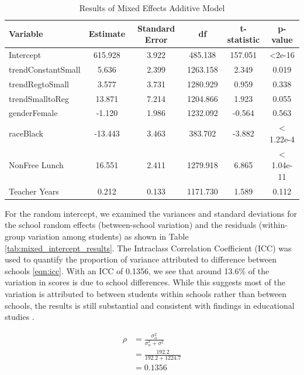 \documentclass[11pt]{article}
\begin{document}
\begin{table}[htbp]
\centering
\caption{Results of Mixed Effects Additive Model}
\label{tab:mixed_results}
\begin{tabular}{lccccc}
\toprule
\textbf{Variable} & \textbf{Estimate} & \textbf{Standard Error} & \textbf{df} & \textbf{t-statistic} & \textbf{p-value} \\
\midrule
Intercept & 615.928 & 3.922 & 485.138 & 157.051 & <2e-16 \\ 
trendConstantSmall & 5.636 & 2.399 & 1263.158 & 2.349 & 0.019 \\
trendRegtoSmall & 3.577 & 3.731 & 1280.929 & 0.959 & 0.338 \\
trendSmalltoReg & 13.871 & 7.214 & 1204.866 & 1.923 & 0.055 \\
genderFemale & -1.120 & 1.986 & 1232.092 & -0.564 & 0.563 \\
raceBlack & -13.443 & 3.463 & 383.702 & -3.882 & < 1.22e-4 \\
NonFree Lunch & 16.551 & 2.411 & 1279.918 & 6.865 & < 1.04e-11 \\
Teacher Years & 0.212 & 0.133 & 1171.730 & 1.589 & 0.112 \\
\bottomrule
\end{tabular}
\end{table}

For the random intercept, we examined the variances and standard deviations for the school random effects (between-school variation) and the residuals (within-group variation among students) as shown in Table \ref{tab:mixed_intercept_results}. The Intraclass Correlation Coefficient (ICC) was used to quantify the proportion of variance attributed to difference between schools \eqref{eqn:icc}. With an ICC of 0.1356, we see that around 13.6\% of the variation in scores is due to school differences. While this suggests most of the variation is attributed to between students within schools rather than between schools, the results is still substantial and consistent with findings in educational studies \cite{shear2026_icc}.

\begin{equation}
    \label{eqn:icc}
    \begin{aligned}
    \rho &= \frac{\sigma^2_\alpha}{\sigma^2_\alpha + \sigma^2}  \\
    &= \frac{192.2}{192.2 + 1224.7} \\
    &= 0.1356
    \end{aligned}
\end{equation}
\end{document}
